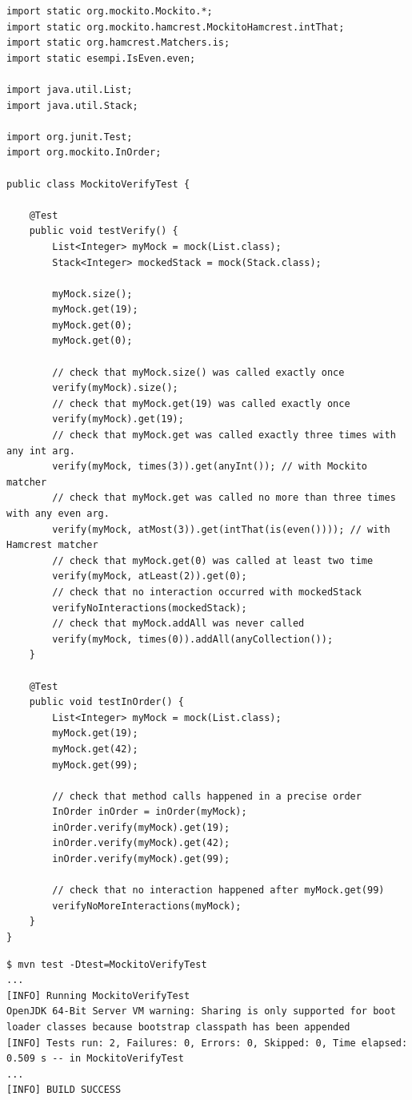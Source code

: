 \begin{lstlisting}[style=java, name=MockitoVerifyTest.java]
import static org.mockito.Mockito.*;
import static org.mockito.hamcrest.MockitoHamcrest.intThat;
import static org.hamcrest.Matchers.is;
import static esempi.IsEven.even;

import java.util.List;
import java.util.Stack;

import org.junit.Test;
import org.mockito.InOrder;

public class MockitoVerifyTest {

    @Test
    public void testVerify() {
        List<Integer> myMock = mock(List.class);
        Stack<Integer> mockedStack = mock(Stack.class);

        myMock.size();
        myMock.get(19);
        myMock.get(0);
        myMock.get(0);

        // check that myMock.size() was called exactly once
        verify(myMock).size();
        // check that myMock.get(19) was called exactly once
        verify(myMock).get(19);
        // check that myMock.get was called exactly three times with any int arg.
        verify(myMock, times(3)).get(anyInt()); // with Mockito matcher
        // check that myMock.get was called no more than three times with any even arg.
        verify(myMock, atMost(3)).get(intThat(is(even()))); // with Hamcrest matcher
        // check that myMock.get(0) was called at least two time
        verify(myMock, atLeast(2)).get(0);
        // check that no interaction occurred with mockedStack
        verifyNoInteractions(mockedStack);
        // check that myMock.addAll was never called
        verify(myMock, times(0)).addAll(anyCollection());
    }

    @Test
    public void testInOrder() {
        List<Integer> myMock = mock(List.class);
        myMock.get(19);
        myMock.get(42);
        myMock.get(99);

        // check that method calls happened in a precise order
        InOrder inOrder = inOrder(myMock);
        inOrder.verify(myMock).get(19);
        inOrder.verify(myMock).get(42);
        inOrder.verify(myMock).get(99);

        // check that no interaction happened after myMock.get(99)
        verifyNoMoreInteractions(myMock);
    }
}
\end{lstlisting}

\begin{lstlisting}[style=shell, name=Terminale]
$ mvn test -Dtest=MockitoVerifyTest
...
[INFO] Running MockitoVerifyTest
OpenJDK 64-Bit Server VM warning: Sharing is only supported for boot loader classes because bootstrap classpath has been appended
[INFO] Tests run: 2, Failures: 0, Errors: 0, Skipped: 0, Time elapsed: 0.509 s -- in MockitoVerifyTest
...
[INFO] BUILD SUCCESS
\end{lstlisting}

